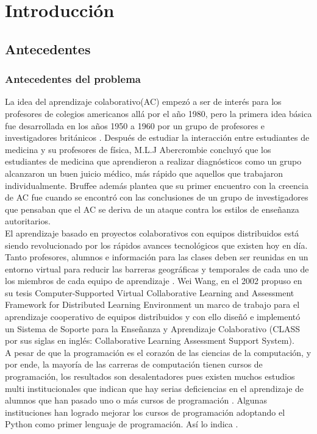 
\chapter{Introducción}
\section{Antecedentes}
\subsection{Antecedentes del problema}
La idea del aprendizaje colaborativo(AC) empezó a ser de interés para los profesores de colegios americanos allá por el año 1980, pero la primera idea básica fue desarrollada en los años 1950 a 1960 por un grupo de profesores e investigadores británicos \cite{bruffee_collaborative_1984}. Después de estudiar la interacción entre estudiantes de medicina y su profesores de física, M.L.J Abercrombie concluyó que los estudiantes de medicina que aprendieron a realizar diagnósticos como un grupo alcanzaron un buen juicio médico, más rápido que aquellos que trabajaron individualmente. Bruffee además plantea que su primer encuentro con la creencia de AC fue cuando se encontró con las conclusiones de un grupo de investigadores que pensaban que el AC se deriva de un ataque contra los estilos de enseñanza autoritarios.\\

El aprendizaje basado en proyectos colaborativos con equipos distribuidos está siendo revolucionado por los rápidos avances tecnológicos que existen hoy en día. Tanto profesores, alumnos e información para las clases deben ser reunidas en un entorno virtual para reducir las barreras geográficas y temporales de cada uno de los miembros de cada equipo de aprendizaje \cite{wang_computer-supported_2002}. Wei Wang, en el 2002 propuso en su tesis Computer-Supported Virtual Collaborative Learning and Assessment Framework for Distributed Learning Environment un marco de trabajo para el aprendizaje cooperativo de equipos distribuidos y con ello diseñó e implementó un Sistema de Soporte para la Enseñanza y Aprendizaje Colaborativo (CLASS por sus siglas en inglés: Collaborative Learning Assessment Support System).\\

A pesar de que la programación es el corazón de las ciencias de la computación, y por ende, la mayoría de las carreras de computación tienen cursos de programación, los resultados son desalentadores pues existen muchos estudios multi institucionales que indican que hay serias deficiencias en el aprendizaje de alumnos que han pasado uno o más cursos de programación \cite{mccracken_multi-national_2001,lister_multi-national_2004,Tenenberg_studentsdesigning_2005}. Algunas instituciones han logrado mejorar los cursos de programación adoptando el Python como primer lenguaje de programación. Así lo indica .\\



